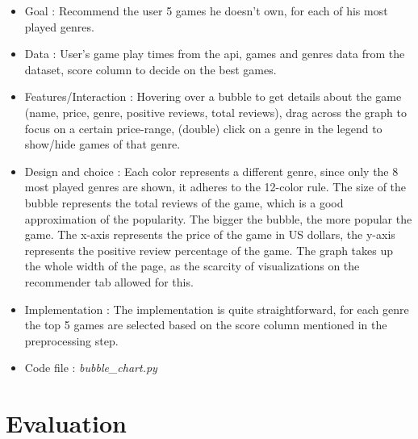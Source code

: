 \documentclass{article}
\begin{document}
	\begin{itemize}
		\item Goal : Recommend the user 5 games he doesn't own, for each of his most played genres.
		\item Data : User's game play times from the api, games and genres data from the dataset, score column to decide on the best games.
		\item Features/Interaction : Hovering over a bubble to get details about the game (name, price, genre, positive reviews, total reviews), drag across the graph to focus on a certain price-range, (double) click on a genre in the legend to show/hide games of that genre. 
		\item Design and choice : Each color represents a different genre, since only the 8 most played genres are shown, it adheres to the 12-color rule. The size of the bubble represents the total reviews of the game, which is a good approximation of the popularity. The bigger the bubble, the more popular the game. The x-axis represents the price of the game in US dollars, the y-axis represents the positive review percentage of the game. The graph takes up the whole width of the page, as the scarcity of visualizations on the recommender tab allowed for this.
		\item Implementation : The implementation is quite straightforward, for each genre the top 5 games are selected based on the score column mentioned in the preprocessing step.
		\item Code file : \textit{bubble\_chart.py}
	\end{itemize}
	
	\newpage

	\section{Evaluation}
	
\end{document}
